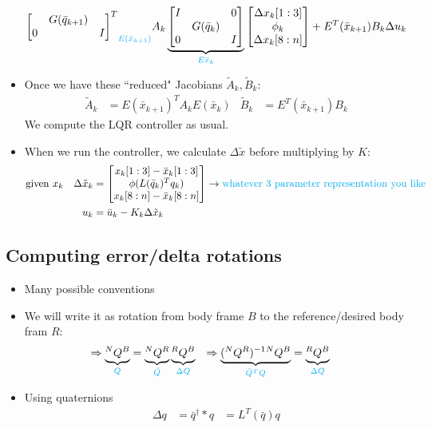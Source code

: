 \documentclass[11pt]{article}
\begin{document}
\begin{itemize}
\begin{align*}
{\begin{bmatrix}
        & G(\bar{q}_{k+1}) & \\
        0 & & I
    \end{bmatrix}^T}_{\textcolor{cyan}{E(\bar{x}_{k+1})}} A_k
    \underbrace{\begin{bmatrix}
        I & & 0 \\
        & G(\bar{q}_k) & \\
        0 & & I
    \end{bmatrix}}_{\textcolor{cyan}{E{\bar{x}_k}}}
    \begin{bmatrix}
        \Delta x_k[1:3] \\
        \phi_k \\
        \Delta x_k[8:n]
    \end{bmatrix}
    + E^T(\bar{x}_{k+1})B_k\Delta u_k
\end{align*}
\item Once we have these ``reduced" Jacobians $\tilde{A}_k, \tilde{B}_k$:
\begin{align*}
    \tilde{A}_k &= E(\bar{x}_{k+1})^TA_kE(\bar{x}_k) & \tilde{B}_k&= E^T(\bar{x}_{k+1})B_k
\end{align*}
We compute the LQR controller as usual.
\item When we run the controller, we calculate $\Delta \tilde{{x}}$ before multiplying by $K$:
\begin{align*}
    \text{given } x_k& & \Delta\tilde{x}_k&= \begin{bmatrix}
        x_k[1:3] - \bar{x}_k[1:3] \\
        \phi(L(\bar{q}_k)^T q_k) \\
        x_k[8:n] - \bar{x}_k[8:n]
    \end{bmatrix}\rightarrow{\textcolor{cyan}{\text{whatever 3 parameter representation you like}}}
    \\
   && u_k &= \bar{u}_k - K_k\Delta\tilde{x}_k
\end{align*}
\end{itemize}

\subsection{Computing error/delta rotations}
\begin{itemize}
    \item Many possible conventions
    \item We will write it as rotation from body frame $B$ to the reference/desired body fram $R$:
    \begin{align*}
        \Rightarrow \underbrace{^NQ^B}_{\textcolor{cyan}{Q}} &= \underbrace{^NQ^R}_{\textcolor{cyan}{\bar{Q}}}\underbrace{^RQ^B}_{\textcolor{cyan}{\Delta Q}} &\Rightarrow \underbrace{(^NQ^R)^{-1}{^NQ^B}}_{\textcolor{cyan}{\bar{Q}^TQ}} &= \underbrace{^RQ^B}_{\textcolor{cyan}{\Delta Q}} 
    \end{align*}
    \item Using quaternions
    \begin{align*}
        \Delta q &= \bar{q}^\dagger * q &= L^T(\bar{q})q
    \end{align*}
\end{itemize}
\end{document}
